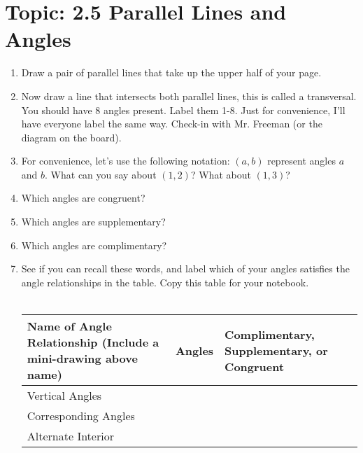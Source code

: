 \documentclass[12pt,letterpaper]{article}
\begin{document}
\section*{Topic: 2.5 Parallel Lines and Angles}
\begin{enumerate}
    \item Draw a pair of parallel lines that take up the upper half of your page.
    \item Now draw a line that intersects both parallel lines, this is called a transversal. You should have 8 angles present. Label them 1-8. Just for convenience, I'll have everyone label the same way. Check-in with Mr. Freeman (or the diagram on the board).
    \item For convenience, let's use the following notation: $(a,b)$ represent angles $a$ and $b$. What can you say about $(1,2)$? What about $(1,3)$?
    \item Which angles are congruent?
    \item Which angles are supplementary?
    \item Which angles are complimentary?
    \item See if you can recall these words, and label which of your angles satisfies the angle relationships in the table. Copy this table for your notebook.\\\\
          \begin{tabularx}{0.95\textwidth} {
                  | >{\raggedright\arraybackslash}X
                  | >{\centering\arraybackslash}X
                  | >{\raggedleft\arraybackslash}X |}
              \hline
              Name of Angle Relationship (Include a mini-drawing above name) & \vspace{2mm}Angles & Complimentary, Supplementary, or Congruent \\
              \hline
              \vspace{5mm}Vertical Angles\vspace{5mm}                        &                    &                                            \\
              \hline
              \vspace{5mm}Corresponding Angles\vspace{5mm}                   &                    &                                            \\
              \hline
              \vspace{5mm}Alternate Interior\vspace{5mm}                     &                    &                                            \\

\end{tabularx}
\end{enumerate}
\end{document}
